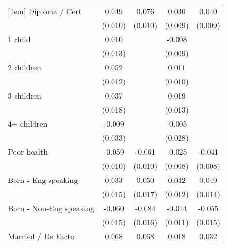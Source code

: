 {\begin{tabular}{l*{4}{c}}
[1em]
Diploma / Cert      &       0.049\sym{***}&       0.076\sym{***}&       0.036\sym{***}&       0.040\sym{***}\\
                    &     (0.010)         &     (0.010)         &     (0.009)         &     (0.009)         \\
[1em]
1 child             &       0.010         &                     &      -0.008         &                     \\
                    &     (0.013)         &                     &     (0.009)         &                     \\
[1em]
2 children          &       0.052\sym{***}&                     &       0.011         &                     \\
                    &     (0.012)         &                     &     (0.010)         &                     \\
[1em]
3 children          &       0.037\sym{*}  &                     &       0.019         &                     \\
                    &     (0.018)         &                     &     (0.013)         &                     \\
[1em]
4+ children         &      -0.009         &                     &      -0.005         &                     \\
                    &     (0.033)         &                     &     (0.028)         &                     \\
[1em]
Poor health         &      -0.059\sym{***}&      -0.061\sym{***}&      -0.025\sym{**} &      -0.041\sym{***}\\
                    &     (0.010)         &     (0.010)         &     (0.008)         &     (0.008)         \\
[1em]
Born - Eng speaking &       0.033\sym{*}  &       0.050\sym{**} &       0.042\sym{***}&       0.049\sym{***}\\
                    &     (0.015)         &     (0.017)         &     (0.012)         &     (0.014)         \\
[1em]
Born - Non-Eng speaking&      -0.060\sym{***}&      -0.084\sym{***}&      -0.014         &      -0.055\sym{***}\\
                    &     (0.015)         &     (0.016)         &     (0.011)         &     (0.015)         \\
[1em]
Married / De Facto  &       0.068\sym{***}&       0.068\sym{***}&       0.018         &       0.032\sym{**} \\

\end{tabular}}

